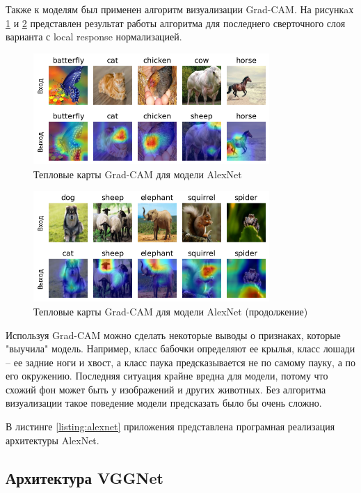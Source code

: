 Также к моделям был применен алгоритм визуализации Grad-CAM.
На рисункaх \ref{fig:alexnet_gradcam_1} и \ref{fig:alexnet_gradcam_2} представлен результат работы алгоритма для последнего сверточного слоя варианта с local response нормализацией.
\newpage
\begin{figure}[h]
    \centering
    \includegraphics[width=0.8\textwidth]{images/alexnet_out_1.png}
    \caption{Тепловые карты Grad-CAM для модели AlexNet}
    \label{fig:alexnet_gradcam_1}
\end{figure}
\begin{figure}[h]
    \centering
    \includegraphics[width=0.8\textwidth]{images/alexnet_out_2.png}
    \caption{Тепловые карты Grad-CAM для модели AlexNet (продолжение)}
    \label{fig:alexnet_gradcam_2}
\end{figure}

Используя Grad-CAM можно сделать некоторые выводы о признаках, которые "выучила" модель.
Например, класс бабочки определяют ее крылья, класс лошади -- ее задние ноги и хвост, а класс паука предсказывается не по самому пауку, а по его окружению.
Последняя ситуация крайне вредна для модели, потому что схожий фон может быть у изображений и других животных.
Без алгоритма визуализации такое поведение модели предсказать было бы очень сложно.

В листинге \ref{listing:alexnet} приложения представлена програмная реализация архитектуры AlexNet.

\newpage
\subsection{Архитектура VGGNet}

